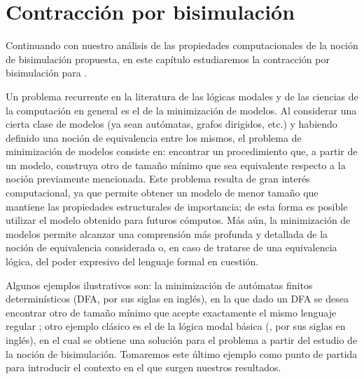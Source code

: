 \chapter{Contracción por bisimulación}



Continuando con nuestro análisis de las propiedades computacionales de la noción de bisimulación propuesta, en este 
capítulo estudiaremos la contracción por bisimulación para \KHilogic.

Un problema recurrente en la literatura de las lógicas modales y de las ciencias de la computación en general es el de la minimización de modelos. 
Al considerar una cierta clase de modelos (ya sean autómatas, grafos dirigidos, etc.) y habiendo definido una noción de equivalencia 
entre los mismos, el problema de minimización de modelos consiste en: encontrar un procedimiento que, a partir de un modelo, construya 
otro de tamaño mínimo %
que sea equivalente respecto a la noción previamente mencionada. Este problema resulta de gran interés computacional, ya que permite 
obtener un modelo de menor tamaño que mantiene las propiedades estructurales de importancia; de esta forma es posible utilizar 
el modelo obtenido para futuros cómputos. Más aún, la minimización de modelos permite alcanzar una comprensión más profunda y detallada
de la noción de equivalencia considerada o, en caso de tratarse de una equivalencia lógica, del poder expresivo del 
lenguaje formal en cuestión.

Algunos ejemplos ilustrativos son: 
la minimización de autómatas finitos determinísticos (DFA, por sus siglas en inglés), en la que dado 
un DFA se desea encontrar otro de tamaño mínimo que acepte exactamente el mismo lenguaje regular \cite{automataTheoryHopcroft}; 
otro ejemplo clásico es el de la lógica modal básica (\bml, por sus siglas en inglés), en el cual se obtiene una solución para el 
problema a partir del estudio de la noción de bisimulación. Tomaremos este último ejemplo como punto de partida para introducir el 
contexto en el que surgen nuestros resultados.

